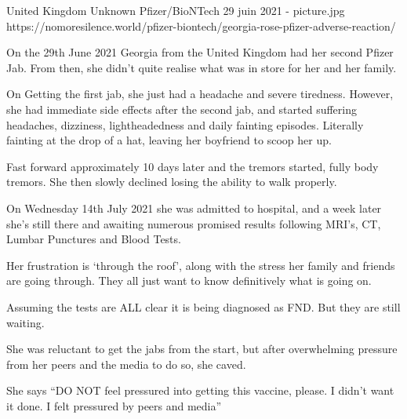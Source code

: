 {United Kingdom}
{Unknown}
{Pfizer/BioNTech}
{29 juin 2021}
{-}
{picture.jpg}
{https://nomoresilence.world/pfizer-biontech/georgia-rose-pfizer-adverse-reaction/}
{


On the 29th June 2021 Georgia from the United Kingdom had her second Pfizer
Jab. From then, she didn’t quite realise what was in store for her and her
family.

On Getting the first jab, she just had a headache and severe tiredness. However,
she had immediate side effects after the second jab, and started suffering
headaches, dizziness, lightheadedness and daily fainting episodes. Literally
fainting at the drop of a hat, leaving her boyfriend to scoop her up.

Fast forward approximately 10 days later and the tremors started, fully body
tremors. She then slowly declined losing the ability to walk properly.

On Wednesday 14th July 2021 she was admitted to hospital, and a week later she’s
still there and awaiting numerous promised results following MRI’s, CT, Lumbar
Punctures and Blood Tests.

Her frustration is ‘through the roof’, along with the stress her family and
friends are going through. They all just want to know definitively what is going
on.

Assuming the tests are ALL clear it is being diagnosed as FND. But they are
still waiting.

She was reluctant to get the jabs from the start, but after overwhelming
pressure from her peers and the media to do so, she caved.

She says “DO NOT feel pressured into getting this vaccine, please. I didn’t want
it done. I felt pressured by peers and media”

}

